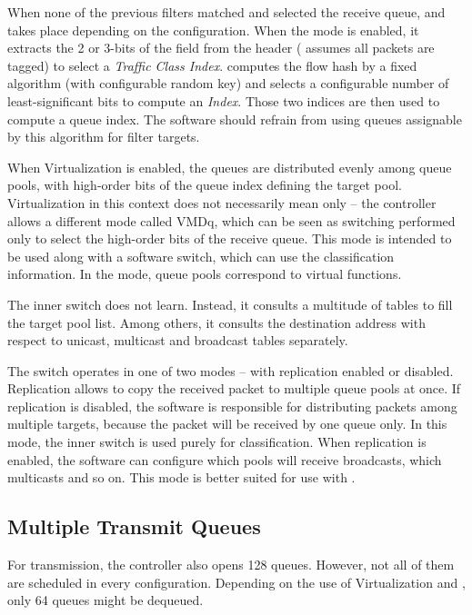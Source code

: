 \noindent When none of the previous filters matched and selected the receive queue, 
and  takes place depending on the configuration. When the  mode
is enabled, it extracts the 2 or 3-bits of the  field from the 
header ( assumes all packets are  tagged) to select
a \emph{Traffic Class Index}.  computes the flow hash by a fixed
algorithm (with configurable random key) and selects a configurable number of
least-significant bits to compute an \emph{ Index}. Those two indices are
then used to compute a queue index. The software should refrain from using queues
assignable by this algorithm for filter targets.

When Virtualization is enabled, the queues are distributed evenly among queue
pools, with high-order bits of the queue index defining the target pool.
Virtualization in this context does not necessarily mean only  -- the
controller allows a different mode called \acrfull{VMDq}, which can be seen as
switching performed only to select the high-order bits of the receive
queue. This mode is intended to be used along with a software switch, which can
use the classification information. In the  mode, queue pools
correspond to virtual functions.

The inner switch does not learn. Instead, it consults a multitude of tables to
fill the target pool list. Among others, it consults the destination 
address with respect to unicast, multicast and broadcast tables separately.

The switch operates in one of two modes -- with replication enabled or
disabled. Replication allows to copy the received packet to multiple queue
pools at once. If replication is disabled, the software is responsible for
distributing packets among multiple targets, because the packet will be
received by one queue only. In this mode, the inner switch is used purely for
classification. When replication is enabled, the software can configure
which pools will receive broadcasts, which multicasts and so on. This mode is
better suited for use with .

\subsection{Multiple Transmit Queues}

For transmission, the controller also opens 128 queues. However, not all of
them are scheduled in every configuration. Depending on the use of Virtualization
and , only 64 queues might be dequeued.

